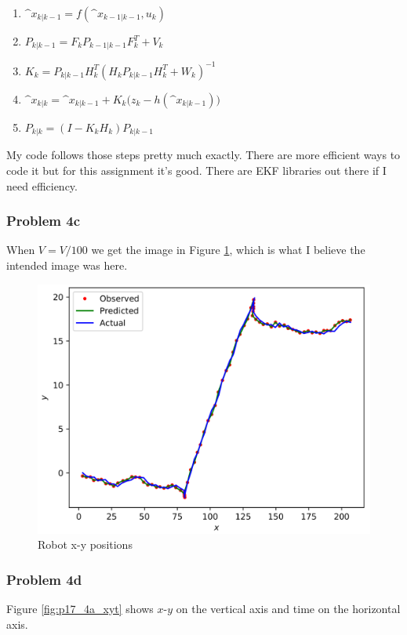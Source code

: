 \documentclass{article}
\begin{document}
\begin{enumerate}
    \item $\^{x}_{k|k-1} = f(\^{x}_{k-1|k-1}, u_k)$
    \item $P_{k|k-1} = F_kP_{k-1|k-1}F^T_k + V_k$
    \item $K_k = P_{k|k-1}H^T_k(H_kP_{k|k-1}H^T_k + W_k)^{-1}$
    \item $\^{x}_{k|k} = \^{x}_{k|k-1} + K_k\big(z_k - h(\^{x}_{k|k-1})\big)$
    \item $P_{k|k} = (I - K_kH_k)P_{k|k-1}$
\end{enumerate}

My code follows those steps pretty much exactly. There are more efficient ways to code it but for this assignment it's good. There are EKF libraries out there if I need efficiency.


\subsubsection{Problem 4c}
When $V = V / 100$ we get the image in Figure \ref{fig:p17_4a_xy}, which is what I believe the intended image was here.

\begin{figure}[h]
    \centering
    \includegraphics[scale=0.75]{problem17_4a_xy}
    \caption{Robot x-y positions}
    \label{fig:p17_4a_xy}
\end{figure}

\subsubsection{Problem 4d}
Figure \ref{fig:p17_4a_xyt} shows $x$-$y$ on the vertical axis and time on the 
horizontal axis.
\end{document}
